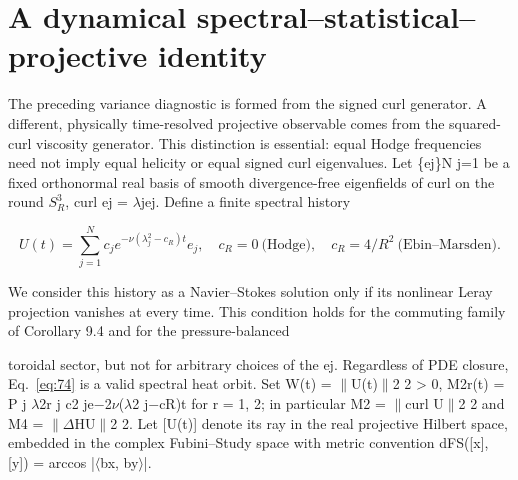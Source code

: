 \documentclass[10pt,letterpaper]{article}
\theoremstyle{remark}
\begin{document}
\section{A dynamical spectral–statistical–projective identity}

The preceding variance diagnostic is formed from the signed curl generator. A different, physically time-resolved projective observable comes from the squared-curl viscosity generator. This distinction is essential: equal Hodge frequencies need not imply equal helicity or equal signed curl eigenvalues. Let \{ej\}N j=1 be a fixed orthonormal real basis of smooth divergence-free eigenfields of curl on the round \(S_R^3\), curl ej = \(\lambda \)jej. Define a finite spectral history



\begin{equation}
\tag{74}\label{eq:74}
U(t)=\sum_{j=1}^N c_je^{-\nu(\lambda_j^2-c_R)t}e_j,\quad c_R=0\ \text{(Hodge)},\quad c_R=4/R^2\ \text{(Ebin--Marsden)}.
\end{equation}

We consider this history as a Navier–Stokes solution only if its nonlinear Leray projection vanishes at every time. This condition holds for the commuting family of Corollary 9.4 and for the pressure-balanced


toroidal sector, but not for arbitrary choices of the ej. Regardless of PDE closure, Eq.~\eqref{eq:74} is a valid spectral heat orbit. Set W(t) = \(\| \)U(t)\(\| \)2 2 > 0, M2r(t) = P j \(\lambda \)2r j c2 je\(- \)2\(\nu \)(\(\lambda \)2 j\(- \)cR)t for r = 1, 2; in particular M2 = \(\| \)curl U\(\| \)2 2 and M4 = \(\| \Delta \)HU\(\| \)2 2. Let [U(t)] denote its ray in the real projective Hilbert space, embedded in the complex Fubini–Study space with metric convention dFS([x], [y]) = arccos |\(\langle \)bx, by\(\rangle \)|.
\end{document}
